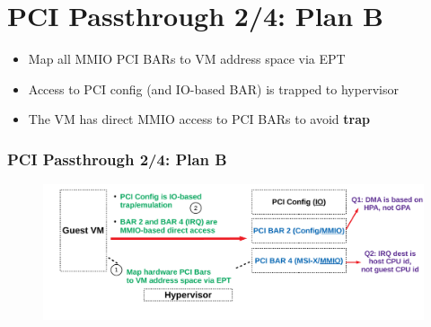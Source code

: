 \documentclass[aspectratio=169]{beamer}
\begin{document}

\section{PCI Passthrough 2/4: Plan B}
\begin{frame}
\begin{itemize}
\item Map all MMIO PCI BARs to VM address space via EPT
\item Access to PCI config (and IO-based BAR) is trapped to hypervisor
\item The VM has direct MMIO access to PCI BARs to avoid \textbf{trap}
\end{itemize}
\frametitle{PCI Passthrough 2/4: Plan B}
\begin{figure}
\includegraphics[width=1.0\linewidth]{figures/plan_b.pdf}
\end{figure}
\end{frame}

\end{document}
